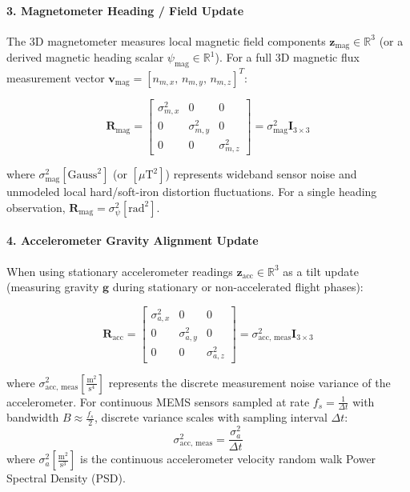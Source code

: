 \documentclass{article}
\begin{document}
	\paragraph{3. Magnetometer Heading / Field Update}
	The 3D magnetometer measures local magnetic field components $\mathbf{z}_{\text{mag}} \in \mathbb{R}^3$ (or a derived magnetic heading scalar $\psi_{\text{mag}} \in \mathbb{R}^1$). For a full 3D magnetic flux measurement vector $\mathbf{v}_{\text{mag}} = [n_{m,x}, \, n_{m,y}, \, n_{m,z}]^T$:
	
	\begin{equation}
		\mathbf{R}_{\text{mag}} = \begin{bmatrix}
			\sigma_{m,x}^2 & 0 & 0 \\
			0 & \sigma_{m,y}^2 & 0 \\
			0 & 0 & \sigma_{m,z}^2
		\end{bmatrix} = \sigma_{\text{mag}}^2 \mathbf{I}_{3 \times 3}
	\end{equation}
	
	where $\sigma_{\text{mag}}^2 \left[\text{Gauss}^2\right]$ (or $\left[\mu\text{T}^2\right]$) represents wideband sensor noise and unmodeled local hard/soft-iron distortion fluctuations. For a single heading observation, $\mathbf{R}_{\text{mag}} = \sigma_{\psi}^2 \left[\text{rad}^2\right]$.
	
	\paragraph{4. Accelerometer Gravity Alignment Update}
	When using stationary accelerometer readings $\mathbf{z}_{\text{acc}} \in \mathbb{R}^3$ as a tilt update (measuring gravity $\mathbf{g}$ during stationary or non-accelerated flight phases):
	
	\begin{equation}
		\mathbf{R}_{\text{acc}} = \begin{bmatrix}
			\sigma_{a,x}^2 & 0 & 0 \\
			0 & \sigma_{a,y}^2 & 0 \\
			0 & 0 & \sigma_{a,z}^2
		\end{bmatrix} = \sigma_{\text{acc, meas}}^2 \mathbf{I}_{3 \times 3}
	\end{equation}
	
	where $\sigma_{\text{acc, meas}}^2 \left[\frac{\text{m}^2}{\text{s}^4}\right]$ represents the discrete measurement noise variance of the accelerometer. For continuous MEMS sensors sampled at rate $f_s = \frac{1}{\Delta t}$ with bandwidth $B \approx \frac{f_s}{2}$, discrete variance scales with sampling interval $\Delta t$:
	\begin{equation}
		\sigma_{\text{acc, meas}}^2 = \frac{\sigma_a^2}{\Delta t}
	\end{equation}
	where $\sigma_a^2 \left[\frac{\text{m}^2}{\text{s}^3}\right]$ is the continuous accelerometer velocity random walk Power Spectral Density (PSD).
\end{document}
